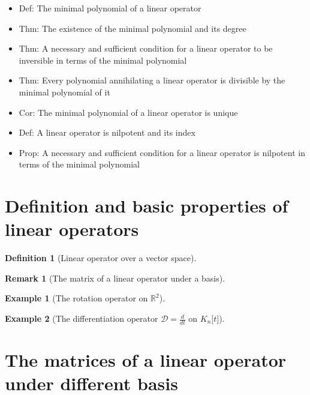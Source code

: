 \documentclass[onecolumn]{ctexart}
\newtheorem{definition}{Definition}
\newtheorem{remark}{Remark}
\newtheorem{example}{Example}
\begin{document}
\begin{itemize}
  \begin{itemize}
    \item Def: The minimal polynomial of a linear operator
    \item Thm: The existence of the minimal polynomial and its degree
    \item Thm: A necessary and sufficient condition for a linear operator to be inversible in terms of the minimal polynomial
    \item Thm: Every polynomial annihilating a linear operator is divisible by the minimal polynomial of it
    \item Cor: The minimal polynomial of a linear operator is unique
    \item Def: A linear operator is nilpotent and its index
    \item Prop: A necessary and sufficient condition for a linear operator is nilpotent in terms of the minimal polynomial
  \end{itemize}
\end{itemize}

\section{Definition and basic properties of linear operators}

\begin{definition}[Linear operator over a vector space]
  
\end{definition}

\begin{remark}[The matrix of a linear operator under a basis]
  
\end{remark}

\begin{example}[The rotation operator on $\mathbb{R}^2$]
  
\end{example}

\begin{example}[The differentiation operator $\mathcal{D} = \frac{d}{dt}$ on $K_n\lbrack t \rbrack$]
  
\end{example}

\section{The matrices of a linear operator under different basis}
\end{document}
